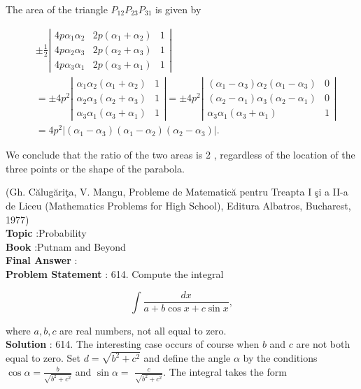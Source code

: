 \documentclass[10pt]{article}
\begin{document}
The area of the triangle $P_{12} P_{23} P_{31}$ is given by

$$
\begin{aligned}
& \pm \frac{1}{2}\left|\begin{array}{lll}4 p \alpha_{1} \alpha_{2} & 2 p\left(\alpha_{1}+\alpha_{2}\right) & 1 \\4 p \alpha_{2} \alpha_{3} & 2 p\left(\alpha_{2}+\alpha_{3}\right) & 1 \\4 p \alpha_{3} \alpha_{1} & 2 p\left(\alpha_{3}+\alpha_{1}\right) & 1\end{array}\right| \\
& =\pm 4 p^{2}\left|\begin{array}{ll}\alpha_{1} \alpha_{2}\left(\alpha_{1}+\alpha_{2}\right) & 1 \\\alpha_{2} \alpha_{3}\left(\alpha_{2}+\alpha_{3}\right) & 1 \\\alpha_{3} \alpha_{1}\left(\alpha_{3}+\alpha_{1}\right) & 1\end{array}\right|=\pm 4 p^{2}\left|\begin{array}{rr}\left(\alpha_{1}-\alpha_{3}\right) \alpha_{2}\left(\alpha_{1}-\alpha_{3}\right) & 0 \\\left(\alpha_{2}-\alpha_{1}\right) \alpha_{3}\left(\alpha_{2}-\alpha_{1}\right) & 0 \\\alpha_{3} \alpha_{1}\left(\alpha_{3}+\alpha_{1}\right) & 1\end{array}\right| \\
& =4 p^{2}\left|\left(\alpha_{1}-\alpha_{3}\right)\left(\alpha_{1}-\alpha_{2}\right)\left(\alpha_{2}-\alpha_{3}\right)\right| \text {. }
\end{aligned}
$$

We conclude that the ratio of the two areas is 2 , regardless of the location of the three points or the shape of the parabola.

(Gh. Călugăriţa, V. Mangu, Probleme de Matematică pentru Treapta I şi a II-a de Liceu (Mathematics Problems for High School), Editura Albatros, Bucharest, 1977)
\\
\textbf{Topic} :Probability\\
\textbf{Book} :Putnam and Beyond\\
\textbf{Final Answer} :\\


\textbf{Problem Statement} :
614. Compute the integral

$$
\int \frac{d x}{a+b \cos x+c \sin x},
$$

where $a, b, c$ are real numbers, not all equal to zero.
\\
\textbf{Solution} :
614. The interesting case occurs of course when $b$ and $c$ are not both equal to zero. Set $d=\sqrt{b^{2}+c^{2}}$ and define the angle $\alpha$ by the conditions $\cos \alpha=\frac{b}{\sqrt{b^{2}+c^{2}}}$ and $\sin \alpha=$ $\frac{c}{\sqrt{b^{2}+c^{2}}}$. The integral takes the form
\end{document}

